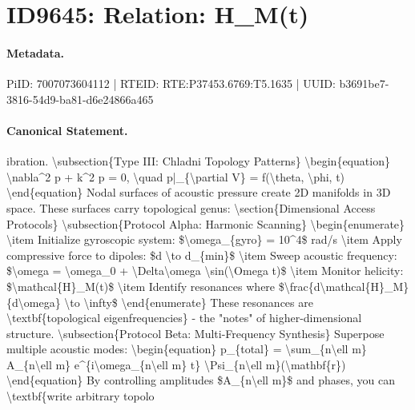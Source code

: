 \section*{ID9645: Relation: H\_M(t)}
\paragraph{Metadata.}
PiID: 7007073604112 | RTEID: RTE:P37453.6769:T5.1635 | UUID: b3691be7-3816-54d9-ba81-d6e24866a465

\paragraph{Canonical Statement.}
ibration. \textbackslash{}subsection\{Type III: Chladni Topology Patterns\} \textbackslash{}begin\{equation\} \textbackslash{}nabla\textasciicircum{}2 p + k\textasciicircum{}2 p = 0, \textbackslash{}quad p|\_\{\textbackslash{}partial V\} = f(\textbackslash{}theta, \textbackslash{}phi, t) \textbackslash{}end\{equation\} Nodal surfaces of acoustic pressure create 2D manifolds in 3D space. These surfaces carry topological genus: \textbackslash{}section\{Dimensional Access Protocols\} \textbackslash{}subsection\{Protocol Alpha: Harmonic Scanning\} \textbackslash{}begin\{enumerate\} \textbackslash{}item Initialize gyroscopic system: \$\textbackslash{}omega\_\{gyro\} = 10\textasciicircum{}4\$ rad/s \textbackslash{}item Apply compressive force to dipoles: \$d \textbackslash{}to d\_\{min\}\$ \textbackslash{}item Sweep acoustic frequency: \$\textbackslash{}omega = \textbackslash{}omega\_0 + \textbackslash{}Delta\textbackslash{}omega \textbackslash{}sin(\textbackslash{}Omega t)\$ \textbackslash{}item Monitor helicity: \$\textbackslash{}mathcal\{H\}\_M(t)\$ \textbackslash{}item Identify resonances where \$\textbackslash{}frac\{d\textbackslash{}mathcal\{H\}\_M\}\{d\textbackslash{}omega\} \textbackslash{}to \textbackslash{}infty\$ \textbackslash{}end\{enumerate\} These resonances are \textbackslash{}textbf\{topological eigenfrequencies\} - the "notes" of higher-dimensional structure. \textbackslash{}subsection\{Protocol Beta: Multi-Frequency Synthesis\} Superpose multiple acoustic modes: \textbackslash{}begin\{equation\} p\_\{total\} = \textbackslash{}sum\_\{n\textbackslash{}ell m\} A\_\{n\textbackslash{}ell m\} e\textasciicircum{}\{i\textbackslash{}omega\_\{n\textbackslash{}ell m\} t\} \textbackslash{}Psi\_\{n\textbackslash{}ell m\}(\textbackslash{}mathbf\{r\}) \textbackslash{}end\{equation\} By controlling amplitudes \$A\_\{n\textbackslash{}ell m\}\$ and phases, you can \textbackslash{}textbf\{write arbitrary topolo

